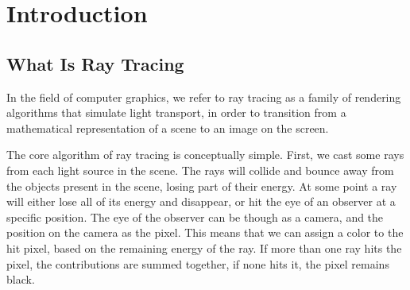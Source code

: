 \documentclass{PoliMi_MasterThesis}
\begin{document}

\chapter*{Introduction}
\section*{What Is Ray Tracing}
In the field of computer graphics, we refer to ray tracing as a family of rendering algorithms that simulate light transport, in order to transition from a mathematical representation of a scene to an image on the screen. 

The core algorithm of ray tracing is conceptually simple. First, we cast some rays from each light source in the scene. The rays will collide and bounce away from the objects present in the scene, losing part of their energy. At some point a ray will either lose all of its energy and disappear, or hit the eye of an observer at a specific position. The eye of the observer can be though as a camera, and the position on the camera as the pixel. This means that we can assign a color to the hit pixel, based on the remaining energy of the ray. If more than one ray hits the pixel, the contributions are summed together, if none hits it, the pixel remains black.
\end{document}
